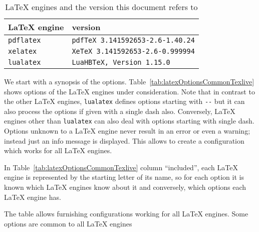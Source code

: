 \documentclass[a4paper, english]{article}%
\newcommand{\pdflatex}{\texttt{pdflatex}}
\newcommand{\lualatex}{\texttt{lualatex}}
\newcommand{\xelatex}{\texttt{xelatex}}
\begin{document}
\begin{longtable}{|ll|}
  \toprule
  \LaTeX{} engine & version \\
  \midrule
  \midrule
  \endfirsthead%
  \bottomrule
  \caption{\label{tab:versions} \LaTeX{} engines and the version this document refers to }
  \endlastfoot%
  \pdflatex{}  & \texttt{pdfTeX 3.141592653-2.6-1.40.24} \\%
  \xelatex{}   & \texttt{XeTeX 3.141592653-2.6-0.999994} \\%
  \lualatex{}  & \texttt{LuaHBTeX, Version 1.15.0} \\
\end{longtable}


We start with a synopsis of the options. 
Table~\ref{tab:latexOptionsCommonTexlive} 
shows options of the \LaTeX{} engines under consideration. 
Note that in contrast to the other \LaTeX{} engines, 
\lualatex{} defines options starting with \texttt{-{}-} 
but it can also process the options if given with a single dash also. 
Conversely, \LaTeX{} engines other than \lualatex{} can also deal with options 
starting with single dash. 
Options unknown to a \LaTeX{} engine never result in an error or even a warning; 
instead just an info message is displayed. 
This allows to create a configuration which works for all \LaTeX{} engines. 

In Table~\ref{tab:latexOptionsCommonTexlive} column ``included'', 
each \LaTeX{} engine is represented by the starting letter of its name, 
so for each option it is known which \LaTeX{} engines know about it 
and conversely, which options each \LaTeX{} engine has. 

The table allows furnishing configurations working for all \LaTeX{} engines. 
Some options are common to all \LaTeX{} engines
\end{document}
